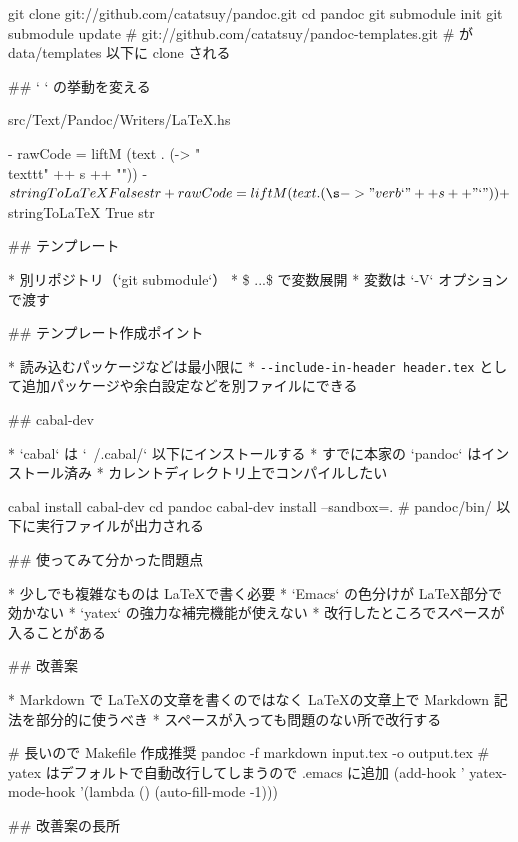 \small

    git clone git://github.com/catatsuy/pandoc.git
    cd pandoc
    git submodule init
    git submodule update
    # git://github.com/catatsuy/pandoc-templates.git
    # が data/templates 以下に clone される


## ` ` の挙動を変える

\small

    src/Text/Pandoc/Writers/LaTeX.hs

\footnotesize

    - rawCode = liftM (text . (\s -> "\\texttt{" ++ s ++ "}"))
    -                  $ stringToLaTeX False str
    + rawCode = liftM (text . (\s -> "\\verb`" ++ s ++ "`"))
    +                  $ stringToLaTeX True str


## テンプレート

* 別リポジトリ（`git submodule`）
* \$ ...\$ で変数展開
    * 変数は `-V` オプションで渡す


## テンプレート作成ポイント

* 読み込むパッケージなどは最小限に
* \verb+--include-in-header header.tex+ として追加パッケージや余白設定などを別ファイルにできる


## cabal-dev

* `cabal` は `~/.cabal/` 以下にインストールする
* すでに本家の `pandoc` はインストール済み
* カレントディレクトリ上でコンパイルしたい

\small

    cabal install cabal-dev
    cd pandoc
    cabal-dev install --sandbox=.
    # pandoc/bin/ 以下に実行ファイルが出力される


## 使ってみて分かった問題点

* 少しでも複雑なものは \LaTeX で書く必要
* `Emacs` の色分けが \LaTeX 部分で効かない
* `yatex` の強力な補完機能が使えない
* 改行したところでスペースが入ることがある


## 改善案

* Markdown で \LaTeX の文章を書くのではなく \LaTeX の文章上で Markdown 記法を部分的に使うべき
* スペースが入っても問題のない所で改行する

\small

    # 長いので Makefile 作成推奨
    pandoc -f markdown input.tex -o output.tex
    # yatex はデフォルトで自動改行してしまうので .emacs に追加
    (add-hook ' yatex-mode-hook '(lambda ()
                               (auto-fill-mode -1)))


## 改善案の長所

